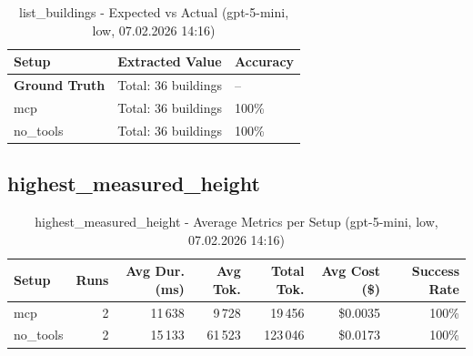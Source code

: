 \documentclass[a4paper,11pt]{article}
\begin{document}
\begin{table}[H]
\centering
\scriptsize
\caption{list\_buildings - Detailed Runs Comparison (gpt-5-mini, low, 07.02.2026 14:16)}
\end{table}

\begin{table}[H]
\centering
\scriptsize
\caption{list\_buildings - Expected vs Actual (gpt-5-mini, low, 07.02.2026 14:16)}
\begin{tabular}{l l l}
\toprule
Setup & Extracted Value & Accuracy \\
\midrule
\textbf{Ground Truth} & Total: 36 buildings & -- \\
\midrule
mcp & Total: 36 buildings & 100\% \\
no\_tools & Total: 36 buildings & 100\% \\
\bottomrule
\end{tabular}
\end{table}

\clearpage

\subsection{highest\_measured\_height}

\begin{table}[H]
\centering
\scriptsize
\caption{highest\_measured\_height - Average Metrics per Setup (gpt-5-mini, low, 07.02.2026 14:16)}
\label{tab:combined\_highest\_measured\_height\_metrics\_20260207}
\begin{tabular}{l r r r r r r}
\toprule
Setup & Runs & Avg Dur. (ms) & Avg Tok. & Total Tok. & Avg Cost (\$) & Success Rate \\
\midrule
mcp & 2 & 11\,638 & 9\,728 & 19\,456 & \$0.0035 & 100\% \\
no\_tools & 2 & 15\,133 & 61\,523 & 123\,046 & \$0.0173 & 100\% \\
\bottomrule
\end{tabular}
\end{table}
\end{document}
